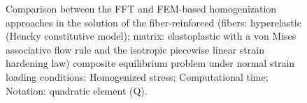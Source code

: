 \begin{figure}[hbt]
\begin{subfigure}[b]{0.49\textwidth}
      \caption{}
      \label{subfig:von_mises_res_mat_large_strain_2D_normal_material_response_error}
    \end{subfigure}
  \caption{Comparison between the FFT and FEM-based homogenization approaches in the solution of the fiber-reinforced (fibers: hyperelastic (Hencky constitutive model); matrix: elastoplastic with a von Mises associative flow rule and the isotropic piecewise linear strain hardening law) composite equilibrium problem under normal strain loading conditions:  Homogenized stress;  Computational time; Notation: quadratic element (Q).}
\label{fig:von_mises_res_mat_large_strain_2D_normal_material_response_and_error}
\end{figure}

